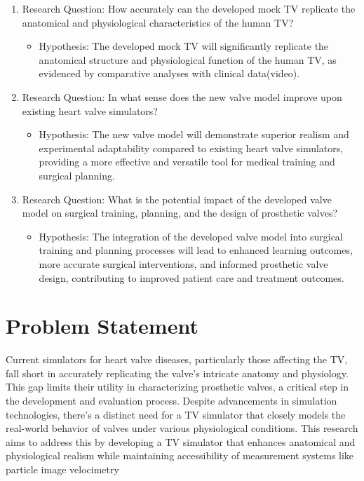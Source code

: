 \begin{enumerate}
    \item Research Question: How accurately can the developed mock \gls{TV} replicate the anatomical and physiological characteristics of the human \gls{TV}?
          \begin{itemize}
              \item Hypothesis: The developed mock \gls{TV} will significantly replicate the anatomical structure and physiological function of the human \gls{TV}, as evidenced by comparative analyses with clinical data(video).
          \end{itemize}

    \item Research Question: In what sense does the new valve model improve upon existing heart valve simulators?
          \begin{itemize}
              \item Hypothesis: The new valve model will demonstrate superior realism and experimental adaptability compared to existing heart valve simulators, providing a more effective and versatile tool for medical training and surgical planning.
          \end{itemize}

    \item Research Question: What is the potential impact of the developed valve model on surgical training, planning, and the design of prosthetic valves?
          \begin{itemize}
              \item Hypothesis: The integration of the developed valve model into surgical training and planning processes will lead to enhanced learning outcomes, more accurate surgical interventions, and informed prosthetic valve design, contributing to improved patient care and treatment outcomes.
          \end{itemize}
\end{enumerate}

\section{Problem Statement}
Current simulators for heart valve diseases, particularly those affecting the \gls{TV}, fall short in accurately replicating the valve's intricate anatomy and physiology. This gap limits their utility in characterizing prosthetic valves, a critical step in the development and evaluation process. Despite advancements in simulation technologies, there's a distinct need for a \gls{TV} simulator that closely models the real-world behavior of valves under various physiological conditions. This research aims to address this by developing a \gls{TV} simulator that enhances anatomical and physiological realism while maintaining accessibility of measurement systems like particle image velocimetry


